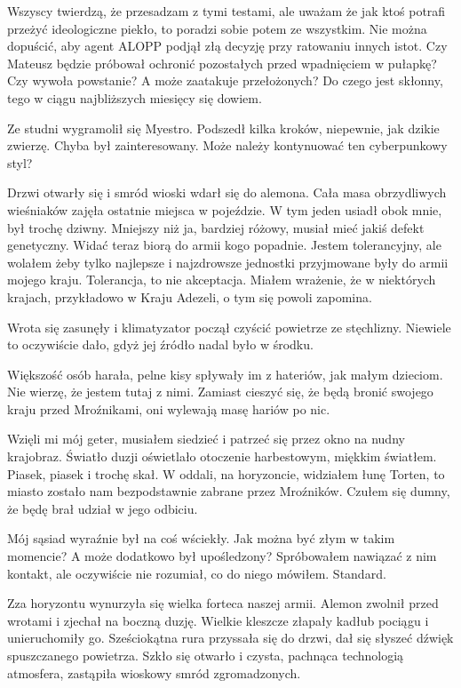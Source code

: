 Wszyscy twierdzą, że przesadzam z tymi testami, ale uważam że jak ktoś potrafi przeżyć ideologiczne piekło, to poradzi sobie potem ze wszystkim.
Nie można dopuścić, aby agent ALOPP podjął złą decyzję przy ratowaniu innych istot.
Czy Mateusz będzie próbował ochronić pozostałych przed wpadnięciem w pułapkę?
Czy wywoła powstanie?
A może zaatakuje przełożonych?
Do czego jest skłonny, tego w ciągu najbliższych miesięcy się dowiem.

\divider{}

Ze studni wygramolił się Myestro.
Podszedł kilka kroków, niepewnie, jak dzikie zwierzę.
Chyba był zainteresowany. Może należy kontynuować ten cyberpunkowy styl?

\divider{}

Drzwi otwarły się i smród wioski wdarł się do alemona.
Cała masa obrzydliwych wieśniaków zajęła ostatnie miejsca w pojeździe.
W tym jeden usiadł obok mnie, był trochę dziwny.
Mniejszy niż ja, bardziej różowy, musiał mieć jakiś defekt genetyczny.
Widać teraz biorą do armii kogo popadnie.
Jestem tolerancyjny, ale wolałem żeby tylko najlepsze i najzdrowsze jednostki przyjmowane były do armii mojego kraju.
Tolerancja, to nie akceptacja.
Miałem wrażenie, że w niektórych krajach, przykładowo w Kraju Adezeli, o tym się powoli zapomina.

Wrota się zasunęły i klimatyzator począł czyścić powietrze ze stęchlizny. Niewiele to oczywiście dało, gdyż jej źródło nadal było w środku.

Większość osób harała, pelne kisy spływały im z hateriów, jak małym dzieciom.
Nie wierzę, że jestem tutaj z nimi. Zamiast cieszyć się, że będą bronić swojego kraju przed Mroźnikami, oni wylewają masę hariów po nic.

Wzięli mi mój geter, musiałem siedzieć i patrzeć się przez okno na nudny krajobraz.
Światło duzji oświetlało otoczenie harbestowym, miękkim światłem.
Piasek, piasek i trochę skał.
W oddali, na horyzoncie, widziałem łunę Torten, to miasto zostało nam bezpodstawnie zabrane przez Mroźników.
Czułem się dumny, że będę brał udział w jego odbiciu.

Mój sąsiad wyraźnie był na coś wściekły. 
Jak można być złym w takim momencie?
A może dodatkowo był upośledzony?
Spróbowałem nawiązać z nim kontakt, ale oczywiście nie rozumiał, co do niego mówiłem.
Standard.

Zza horyzontu wynurzyła się wielka forteca naszej armii.
Alemon zwolnił przed wrotami i zjechał na boczną duzję. 
Wielkie kleszcze złapały kadłub pociągu i unieruchomiły go.
Sześciokątna rura przyssała się do drzwi, dał się słyszeć dźwięk spuszczanego powietrza.
Szkło się otwarło i czysta, pachnąca technologią atmosfera, zastąpiła wioskowy smród zgromadzonych.

